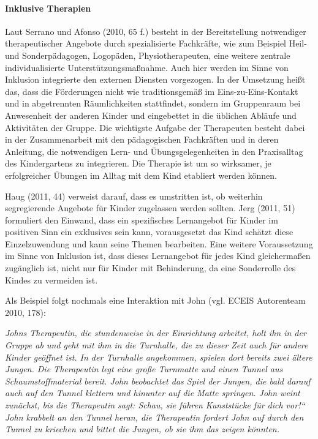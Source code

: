 \paragraph{Inklusive Therapien} Laut Serrano und Afonso (2010, 65 f.) besteht in der Bereitstellung notwendiger therapeutischer Angebote durch spezialisierte Fachkräfte, wie zum Beispiel Heil- und Sonderpädagogen, Logopäden, Physiotherapeuten, eine weitere zentrale individualisierte Unterstützungsmaßnahme. Auch hier werden im Sinne von Inklusion integrierte den externen Diensten vorgezogen. In der Umsetzung heißt das, dass die Förderungen nicht wie traditionsgemäß im Eins-zu-Eins-Kontakt und in abgetrennten Räumlichkeiten stattfindet, sondern im Gruppenraum bei Anwesenheit der anderen Kinder und eingebettet in die üblichen Abläufe und Aktivitäten der Gruppe. Die wichtigste Aufgabe der Therapeuten besteht dabei in der Zusammenarbeit mit den pädagogischen Fachkräften und in deren Anleitung, die notwendigen Lern- und Übungsgelegenheiten in den Praxisalltag des Kindergartens zu integrieren. Die Therapie ist um so wirksamer, je erfolgreicher Übungen im Alltag mit dem Kind etabliert werden können.

Haug (2011, 44) verweist darauf, dass es umstritten ist, ob weiterhin segregierende Angebote für Kinder zugelassen werden sollten. Jerg (2011, 51) formuliert den Einwand, dass ein spezifisches Lernangebot für Kinder im positiven Sinn ein exklusives sein kann, vorausgesetzt das Kind schätzt diese Einzelzuwendung und kann seine Themen bearbeiten. Eine weitere Voraussetzung im Sinne von Inklusion ist, dass dieses Lernangebot für jedes Kind gleichermaßen zugänglich ist, nicht nur für Kinder mit Behinderung, da eine Sonderrolle des Kindes zu vermeiden ist. 

Als Beispiel folgt nochmals eine Interaktion mit John (vgl. ECEIS Autorenteam 2010, 178):

\emph{Johns Therapeutin, die stundenweise in der Einrichtung arbeitet, holt ihn in der Gruppe ab und geht mit ihm in die Turnhalle, die zu dieser Zeit auch für andere Kinder geöffnet ist. In der Turnhalle angekommen, spielen dort bereits zwei ältere Jungen. Die Therapeutin legt eine große Turnmatte und einen Tunnel aus Schaumstoffmaterial bereit. John beobachtet das Spiel der Jungen, die bald darauf auch auf den Tunnel klettern und hinunter auf die Matte springen. John weint zunächst, bis die Therapeutin sagt: Schau, sie führen Kunststücke für dich vor!“ John krabbelt an den Tunnel heran, die Therapeutin fordert John auf durch den Tunnel zu kriechen und bittet die Jungen, ob sie ihm das zeigen könnten.}

